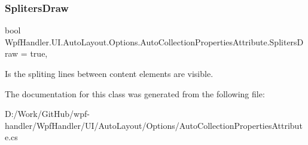 \subsubsection{\texorpdfstring{Spliters\+Draw}{SplitersDraw}}
{\footnotesize\ttfamily bool Wpf\+Handler.\+U\+I.\+Auto\+Layout.\+Options.\+Auto\+Collection\+Properties\+Attribute.\+Spliters\+Draw = true\hspace{0.3cm}{\ttfamily [get]}, {\ttfamily [set]}}



Is the spliting lines between content elements are visible. 



The documentation for this class was generated from the following file\+:\begin{DoxyCompactItemize}
\item 
D\+:/\+Work/\+Git\+Hub/wpf-\/handler/\+Wpf\+Handler/\+U\+I/\+Auto\+Layout/\+Options/Auto\+Collection\+Properties\+Attribute.\+cs\end{DoxyCompactItemize}
